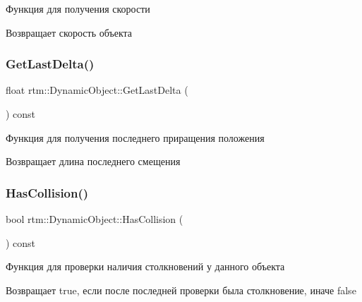 Функция для получения скорости 

\begin{DoxyReturn}{Возвращает}
скорость объекта 
\end{DoxyReturn}
\mbox{\label{classrtm_1_1_dynamic_object_ada2fd3defc1cea052020023b99be12ec}} 
\subsubsection{\texorpdfstring{Get\+Last\+Delta()}{GetLastDelta()}}
{\footnotesize\ttfamily float rtm\+::\+Dynamic\+Object\+::\+Get\+Last\+Delta (\begin{DoxyParamCaption}{ }\end{DoxyParamCaption}) const}



Функция для получения последнего приращения положения 

\begin{DoxyReturn}{Возвращает}
длина последнего смещения 
\end{DoxyReturn}
\mbox{\label{classrtm_1_1_dynamic_object_a0bc9390b78faf5c770bff86a2e451ec6}} 
\subsubsection{\texorpdfstring{Has\+Collision()}{HasCollision()}}
{\footnotesize\ttfamily bool rtm\+::\+Dynamic\+Object\+::\+Has\+Collision (\begin{DoxyParamCaption}{ }\end{DoxyParamCaption}) const}



Функция для проверки наличия столкновений у данного объекта 

\begin{DoxyReturn}{Возвращает}
true, если после последней проверки была столкновение, иначе false 
\end{DoxyReturn}
\mbox{\label{classrtm_1_1_dynamic_object_a2b2a4072f80d6be9c8d1097bc072197e}} 
